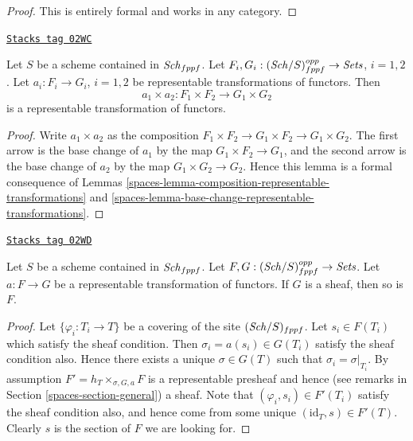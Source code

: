 \begin{proof}
This is entirely formal and works in any category.
\end{proof}

\begin{lemma}
\label{spaces-lemma-product-representable-transformations}
\href{https://stacks.math.columbia.edu/tag/02WC}{\texttt{Stacks tag 02WC}}

Let $S$ be a scheme contained in $\mathit{Sch}_{fppf}$.
Let $F_i, G_i : (\mathit{Sch}/S)_{fppf}^{opp} \to \textit{Sets}$, $i = 1, 2$.
Let $a_i : F_i \to G_i$, $i = 1, 2$
be representable transformations of functors.
Then
$$
a_1 \times a_2 : F_1 \times F_2 \longrightarrow G_1 \times G_2
$$
is a representable transformation of functors.
\end{lemma}

\begin{proof}

Write $a_1 \times a_2$ as the composition
$F_1 \times F_2 \to G_1 \times F_2 \to G_1 \times G_2$.
The first arrow is the base change of $a_1$ by the map
$G_1 \times F_2 \to G_1$, and the second arrow
is the base change of $a_2$ by the map
$G_1 \times G_2 \to G_2$. Hence this lemma is a formal
consequence of Lemmas \ref{spaces-lemma-composition-representable-transformations}
and \ref{spaces-lemma-base-change-representable-transformations}.
\end{proof}

\begin{lemma}
\label{spaces-lemma-representable-transformation-to-sheaf}
\href{https://stacks.math.columbia.edu/tag/02WD}{\texttt{Stacks tag 02WD}}

Let $S$ be a scheme contained in $\mathit{Sch}_{fppf}$.
Let $F, G : (\mathit{Sch}/S)_{fppf}^{opp} \to \textit{Sets}$.
Let $a : F \to G$ be a representable transformation of functors.
If $G$ is a sheaf, then so is $F$.
\end{lemma}

\begin{proof}
Let $\{\varphi_i : T_i \to T\}$ be a covering of the site
$(\mathit{Sch}/S)_{fppf}$.
Let $s_i \in F(T_i)$ which satisfy the sheaf condition.
Then $\sigma_i = a(s_i) \in G(T_i)$ satisfy the sheaf condition
also. Hence there exists a unique $\sigma \in G(T)$ such
that $\sigma_i = \sigma|_{T_i}$. By assumption
$F' = h_T \times_{\sigma, G, a} F$ is a representable presheaf
and hence (see remarks in Section \ref{spaces-section-general}) a sheaf.
Note that $(\varphi_i, s_i) \in F'(T_i)$ satisfy the
sheaf condition also, and hence come from some unique
$(\text{id}_T, s) \in F'(T)$. Clearly $s$ is the section of
$F$ we are looking for.
\end{proof}

